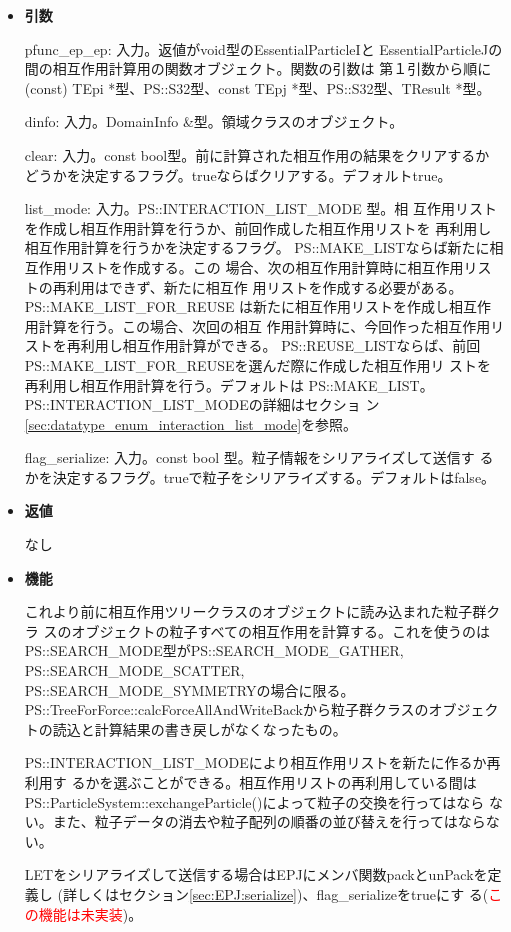 \begin{itemize}

\item {\bf 引数}

pfunc\_ep\_ep: 入力。返値がvoid型のEssentialParticleIと
EssentialParticleJの間の相互作用計算用の関数オブジェクト。関数の引数は
第１引数から順に(const) TEpi *型、PS::S32型、const
TEpj *型、PS::S32型、TResult *型。

dinfo: 入力。DomainInfo \&型。領域クラスのオブジェクト。

clear: 入力。const bool型。前に計算された相互作用の結果をクリアするか
どうかを決定するフラグ。trueならばクリアする。デフォルトtrue。

list\_mode: 入力。PS::INTERACTION\_LIST\_MODE 型。相
互作用リストを作成し相互作用計算を行うか、前回作成した相互作用リストを
再利用し相互作用計算を行うかを決定するフラグ。
PS::MAKE\_LISTならば新たに相互作用リストを作成する。この
場合、次の相互作用計算時に相互作用リストの再利用はできず、新たに相互作
用リストを作成する必要がある。PS::MAKE\_LIST\_FOR\_REUSE
は新たに相互作用リストを作成し相互作用計算を行う。この場合、次回の相互
作用計算時に、今回作った相互作用リストを再利用し相互作用計算ができる。
PS::REUSE\_LISTならば、前回
PS::MAKE\_LIST\_FOR\_REUSEを選んだ際に作成した相互作用リ
ストを再利用し相互作用計算を行う。デフォルトは
PS::MAKE\_LIST。PS::INTERACTION\_LIST\_MODEの詳細はセクショ
ン\ref{sec:datatype_enum_interaction_list_mode}を参照。

flag\_serialize: 入力。const bool 型。粒子情報をシリアライズして送信す
るかを決定するフラグ。trueで粒子をシリアライズする。デフォルトはfalse。

\item {\bf 返値}

なし

\item {\bf 機能}

これより前に相互作用ツリークラスのオブジェクトに読み込まれた粒子群クラ
スのオブジェクトの粒子すべての相互作用を計算する。これを使うのは
PS::SEARCH\_MODE型がPS::SEARCH\_MODE\_GATHER,
PS::SEARCH\_MODE\_SCATTER,\\ PS::SEARCH\_MODE\_SYMMETRYの場合に限る。
PS::TreeForForce::calcForceAllAndWriteBackから粒子群クラスのオブジェク
トの読込と計算結果の書き戻しがなくなったもの。

PS::INTERACTION\_LIST\_MODEにより相互作用リストを新たに作るか再利用す
るかを選ぶことができる。相互作用リストの再利用している間は
PS::ParticleSystem::exchangeParticle()によって粒子の交換を行ってはなら
ない。また、粒子データの消去や粒子配列の順番の並び替えを行ってはならな
い。

LETをシリアライズして送信する場合はEPJにメンバ関数packとunPackを定義し
(詳しくはセクション\ref{sec:EPJ:serialize})、flag\_serializeをtrueにす
る(\textcolor{red}{この機能は未実装})。

\end{itemize}


